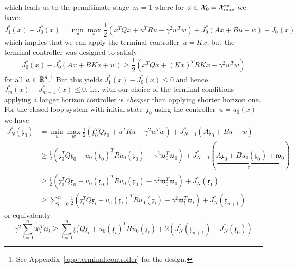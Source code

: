 %
which leads us to the penultimate stage~$m=1$ where for~$x\in\mathcal X_0=\mathcal X_{\max}^\infty$ we have:
%
\begin{equation}
	J_1^\ast(x) - J_0^\ast(x) = \min_u\max_w \frac{1}{2}\left(x^TQx+u^TRu-\gamma^2w^Tw\right) + J_0^\ast(Ax+Bu+w)- J_0(x)
\end{equation}
%
which implies that we can apply the terminal controller~$u=Kx$, but the terminal controller was designed to satisfy
%
\begin{equation}
	J_0^\ast(x)-J_0^\ast(Ax+BKx+w)\geq\frac{1}{2}\left(x^TQx+(Kx)^TRKx-\gamma^2w^Tw\right)
\end{equation}
%
for all $w\in\mathbb R^d$.\footnote{See Appendix~\ref{app:terminal:controller} for the design.}
%
But this yields $J_1^\ast(x) - J_0^\ast(x)\leq0$ and hence~$J_m^\ast(x)-J_{m-1}^\ast(x)\leq 0$, i.e. with our choice of the terminal conditions applying a longer horizon controller is \emph{cheaper} than applying shorter horizon one.
%
For the closed-loop system with initial state~$\mathfrak{x}_0$ using the controller~$u=u_0(x)$ we have
%
\begin{equation}\label{eq:decrease:of:cost:function}\begin{aligned}
	J_N^\ast(\mathfrak{x}_0) &= \min_u\max_w \frac{1}{2}\left(\mathfrak{x}_0^TQ\mathfrak{x}_0+u^TRu-\gamma^2w^Tw\right) + J_{N-1}^\ast(A\mathfrak{x}_0+Bu+w)\\
	&\geq \frac{1}{2}\left(\mathfrak{x}_0^TQ\mathfrak{x}_0+u_0(\mathfrak{x}_0)^TRu_0(\mathfrak{x}_0)-\gamma^2\mathfrak{w}_0^T\mathfrak{w}_0\right) + J_{N-1}^\ast(\underbrace{A\mathfrak{x}_0+Bu_0(\mathfrak{x}_0)+\mathfrak{w}_0}_{\mathfrak{x}_1})\\
	&\geq \frac{1}{2}\left(\mathfrak{x}_0^TQ\mathfrak{x}_0+u_0(\mathfrak{x}_0)^TR u_0(\mathfrak{x}_0)-\gamma^2\mathfrak{w}_0^T\mathfrak{w}_0\right) + J_{N}^\ast(\mathfrak{x}_1)\\
	&\geq \sum_{l=0}^n \frac{1}{2}\left(\mathfrak{x}_l^TQ\mathfrak{x}_l+u_0(\mathfrak{x}_l)^TRu_0(\mathfrak{x}_l)-\gamma^2\mathfrak{w}_l^T\mathfrak{w}_l\right) + J_{N}^\ast(\mathfrak{x}_{n+1})
\end{aligned}\end{equation}
%
or equivalently
%
\begin{equation}\label{eq:upper:bound:using:gamma}
	\gamma^2 \sum_{l=0}^n \mathfrak{w}_l^T\mathfrak{w}_l \geq \sum_{l=0}^n \mathfrak{x}_l^TQ\mathfrak{x}_l+u_0(\mathfrak{x}_l)^TRu_0(\mathfrak{x}_l) + 2\left(J_N^\ast(\mathfrak{x}_{n+1})-J_N^\ast(\mathfrak{x}_0)\right)
\end{equation}
